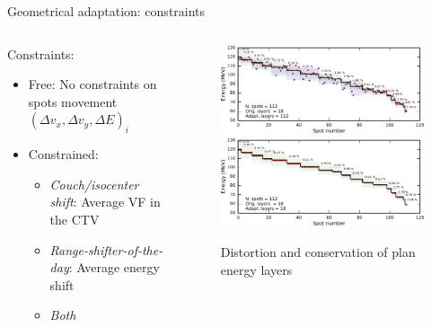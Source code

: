 \begin{frame}[c]{Geometrical adaptation: constraints}
    \begin{columns}[c]
        \begin{column}{0.45\textwidth}
            Constraints:
            \begin{itemize}
                \item {\color{brandeisblue} Free:} No constraints on spots movement $(\Delta v_x, \Delta v_y, \Delta E)_i$
                \item {\color{brandeisblue} Constrained:}
                \begin{itemize}
                    \item \textit{Couch/isocenter shift}: Average VF in the CTV
                    \item \textit{Range-shifter-of-the-day}: Average energy shift
                    \item \textit{Both}
                \end{itemize}
            \end{itemize}
        \end{column}
        \begin{column}{0.55\textwidth}
            \vspace*{-0.4cm}
            \begin{figure}[b!]
                \centering
                \includegraphics[width=\textwidth]{imgs/plan_energy_layer_destruction.pdf}\\
                \includegraphics[width=\textwidth]{imgs/plan_energy_layer_conservation.pdf}
                \caption{Distortion and conservation of plan energy layers}
            \end{figure}
        \end{column}
    \end{columns}
\end{frame}


